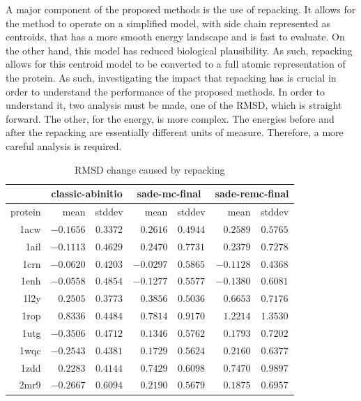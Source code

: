 A major component of the proposed methods is the use of repacking. It allows for
the method to operate on a simplified model, with side chain represented as
centroids, that has a more smooth energy landscape and is fast to evaluate. On
the other hand, this model has reduced biological plausibility. As such,
repacking allows for this centroid model to be converted to a full atomic
representation of the protein. As such, investigating the impact that repacking
has is crucial in order to understand the performance of the proposed methods.
In order to understand it, two analysis must be made, one of the RMSD, which is
straight forward. The other, for the energy, is more complex. The energies before
and after the repacking are essentially different units of measure. Therefore, a
more careful analysis is required.

\begin{table}
  \centering
  \begin{tabular}{r|r|c||r|c||r|c}
            & \multicolumn{2}{c}{classic-abinitio} & \multicolumn{2}{||c}{sade-mc-final} & \multicolumn{2}{||c}{sade-remc-final} \\ \hline
    protein & mean      & stddev   & mean      & stddev   & mean      & stddev   \\ \hline \hline
    1acw    & $-0.1656$ & $0.3372$ & $0.2616$  & $0.4944$ & $0.2589$  & $0.5765$ \\ \hline
    1ail    & $-0.1113$ & $0.4629$ & $0.2470$  & $0.7731$ & $0.2379$  & $0.7278$ \\ \hline
    1crn    & $-0.0620$ & $0.4203$ & $-0.0297$ & $0.5865$ & $-0.1128$ & $0.4368$ \\ \hline
    1enh    & $-0.0558$ & $0.4854$ & $-0.1277$ & $0.5577$ & $-0.1380$ & $0.6081$ \\ \hline
    1l2y    & $0.2505$  & $0.3773$ & $0.3856$  & $0.5036$ & $0.6653$  & $0.7176$ \\ \hline
    1rop    & $0.8336$  & $0.4484$ & $0.7814$  & $0.9170$ & $1.2214$  & $1.3530$ \\ \hline
    1utg    & $-0.3506$ & $0.4712$ & $0.1346$  & $0.5762$ & $0.1793$  & $0.7202$ \\ \hline
    1wqc    & $-0.2543$ & $0.4381$ & $0.1729$  & $0.5624$ & $0.2160$  & $0.6377$ \\ \hline
    1zdd    & $0.2283$  & $0.4144$ & $0.7429$  & $0.6098$ & $0.7470$  & $0.9897$ \\ \hline
    2mr9    & $-0.2667$ & $0.6094$ & $0.2190$  & $0.5679$ & $0.1875$  & $0.6957$ \\ \hline
  \end{tabular}
  \caption{RMSD change caused by repacking}
  \label{tab:repack-impact-rmsd}
\end{table}

